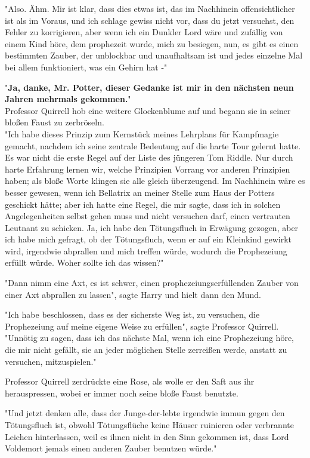 {"Also. Ähm. Mir ist klar, dass dies etwas ist, das im Nachhinein offensichtlicher ist als im Voraus, und ich schlage gewiss nicht vor, dass du jetzt versuchst, den Fehler zu korrigieren, aber wenn ich ein Dunkler Lord wäre und zufällig von einem Kind höre, dem prophezeit wurde, mich zu besiegen, nun, es gibt es einen bestimmten Zauber, der unblockbar und unaufhaltsam ist und jedes einzelne Mal bei allem funktioniert, was ein Gehirn hat -"

"\textbf{Ja, danke, Mr. Potter, dieser Gedanke ist mir in den nächsten neun Jahren mehrmals gekommen.}"\\ Professor Quirrell hob eine weitere Glockenblume auf und begann sie in seiner bloßen Faust zu zerbröseln.\\ "Ich habe dieses Prinzip zum Kernstück meines Lehrplans für Kampfmagie gemacht, nachdem ich seine zentrale Bedeutung auf die harte Tour gelernt hatte. Es war nicht die erste Regel auf der Liste des jüngeren Tom Riddle. Nur durch harte Erfahrung lernen wir, welche Prinzipien Vorrang vor anderen Prinzipien haben; als bloße Worte klingen sie alle gleich überzeugend. Im Nachhinein wäre es besser gewesen, wenn ich Bellatrix an meiner Stelle zum Haus der Potters geschickt hätte; aber ich hatte eine Regel, die mir sagte, dass ich in solchen Angelegenheiten selbst gehen muss und nicht versuchen darf, einen vertrauten Leutnant zu schicken. Ja, ich habe den Tötungsfluch in Erwägung gezogen, aber ich habe mich gefragt, ob der Tötungsfluch, wenn er auf ein Kleinkind gewirkt wird, irgendwie abprallen und mich treffen würde, wodurch die Prophezeiung erfüllt würde. Woher sollte ich das wissen?"

"Dann nimm eine Axt, es ist schwer, einen prophezeiungserfüllenden Zauber von einer Axt abprallen zu lassen", sagte Harry und hielt dann den Mund.

"Ich habe beschlossen, dass es der sicherste Weg ist, zu versuchen, die Prophezeiung auf meine eigene Weise zu erfüllen", sagte Professor Quirrell.\\ "Unnötig zu sagen, dass ich das nächste Mal, wenn ich eine Prophezeiung höre, die mir nicht gefällt, sie an jeder möglichen Stelle zerreißen werde, anstatt zu versuchen, mitzuspielen."

Professor Quirrell zerdrückte eine Rose, als wolle er den Saft aus ihr herauspressen, wobei er immer noch seine bloße Faust benutzte.

"Und jetzt denken alle, dass der Junge-der-lebte irgendwie immun gegen den Tötungsfluch ist, obwohl Tötungsflüche keine Häuser ruinieren oder verbrannte Leichen hinterlassen, weil es ihnen nicht in den Sinn gekommen ist, dass Lord Voldemort jemals einen anderen Zauber benutzen würde."

}
